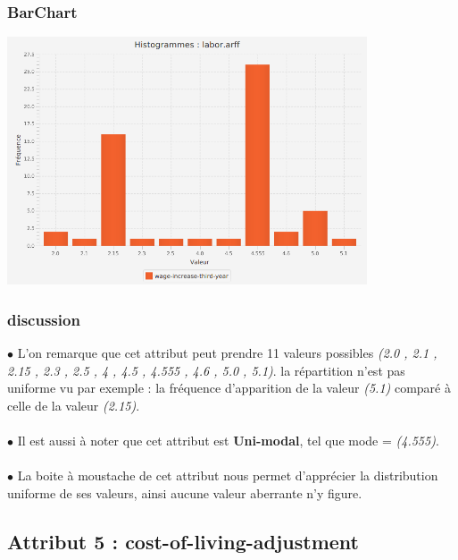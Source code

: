 \documentclass[12pt,a4paper,oneside]{book}
\begin{document}
	\subsubsection{BarChart}
	
	\begin{center}
		\includegraphics[width=0.8\textwidth]{screens/barchart/wage-increase-third-year-barchart.png}%
		\label{labelname}%
	\end{center}
	
	\subsubsection{discussion}
	$\bullet $ L'on remarque que cet attribut peut prendre 11 valeurs possibles \textit{(2.0 , 2.1 , 2.15 , 2.3 , 2.5 , 4 , 4.5 , 4.555 , 4.6 , 5.0 , 5.1)}. la répartition n'est pas uniforme vu par exemple : la fréquence d'apparition de la valeur \textit{(5.1)} comparé à celle de la valeur \textit{(2.15)}.\\
	\textbf{ }\\
	$\bullet $ Il est aussi à noter que cet attribut est \textbf{Uni-modal}, tel que mode = \textit{(4.555)}.\\
	\textbf{ }\\
	$\bullet $ La boite à moustache de cet attribut nous permet d'apprécier la distribution uniforme de ses valeurs, ainsi aucune valeur aberrante n'y
	figure.
	
	
	\newpage
	
	\subsection{Attribut 5 : cost-of-living-adjustment }
\end{document}
